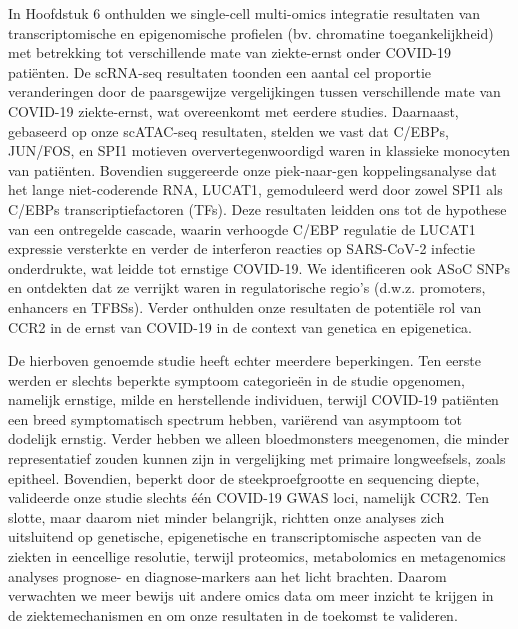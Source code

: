 \documentclass{book}
\begin{document}
\begin{refsection}
In Hoofdstuk 6 onthulden we single-cell multi-omics integratie resultaten van transcriptomische en epigenomische profielen (bv. chromatine toegankelijkheid) met betrekking tot verschillende mate van ziekte-ernst onder COVID-19 patiënten.
De scRNA-seq resultaten toonden een aantal cel proportie veranderingen door de paarsgewijze vergelijkingen tussen verschillende mate van COVID-19 ziekte-ernst, wat overeenkomt met eerdere studies.
Daarnaast, gebaseerd op onze scATAC-seq resultaten, stelden we vast dat C/EBPs, JUN/FOS, en SPI1 motieven oververtegenwoordigd waren in klassieke monocyten van patiënten.
Bovendien suggereerde onze piek-naar-gen koppelingsanalyse dat het lange niet-coderende RNA, LUCAT1, gemoduleerd werd door zowel SPI1 als C/EBPs transcriptiefactoren (TFs).
Deze resultaten leidden ons tot de hypothese van een ontregelde cascade, waarin verhoogde C/EBP regulatie de LUCAT1 expressie versterkte en verder de interferon reacties op SARS-CoV-2 infectie onderdrukte, wat leidde tot ernstige COVID-19.
We identificeren ook ASoC SNPs en ontdekten dat ze verrijkt waren in regulatorische regio's (d.w.z. promoters, enhancers en TFBSs). Verder onthulden onze resultaten de potentiële rol van CCR2 in de ernst van COVID-19 in de context van genetica en epigenetica.

De hierboven genoemde studie heeft echter meerdere beperkingen.
Ten eerste werden er slechts beperkte symptoom categorieën in de studie opgenomen, namelijk ernstige, milde en herstellende individuen, terwijl COVID-19 patiënten een breed symptomatisch spectrum hebben, variërend van asymptoom tot dodelijk ernstig.
Verder hebben we alleen bloedmonsters meegenomen, die minder representatief zouden kunnen zijn in vergelijking met primaire longweefsels, zoals epitheel.
Bovendien, beperkt door de steekproefgrootte en sequencing diepte, valideerde onze studie slechts één COVID-19 GWAS loci, namelijk CCR2.
Ten slotte, maar daarom niet minder belangrijk, richtten onze analyses zich uitsluitend op genetische, epigenetische en transcriptomische aspecten van de ziekten in eencellige resolutie, terwijl proteomics, metabolomics en metagenomics analyses prognose- en diagnose-markers aan het licht brachten.
Daarom verwachten we meer bewijs uit andere omics data om meer inzicht te krijgen in de ziektemechanismen en om onze resultaten in de toekomst te valideren.


\end{refsection}
\end{document}

